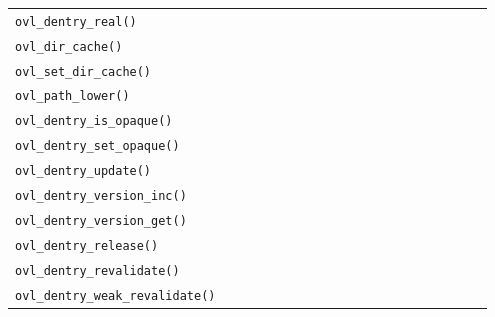 \documentclass[twoside,11pt,fleqn]{book}
\begin{document}
\begin{table}[!h]
\begin{tabular}{|p{0.30\linewidth}|p{0.65\linewidth}|}
\texttt{ovl\_dentry\_real()}&\\ \cline{1-1}
\texttt{ovl\_dir\_cache()}&\\ \cline{1-1}
\texttt{ovl\_set\_dir\_cache()}&\\ \cline{1-1}
\texttt{ovl\_path\_lower()}&\\ \cline{1-1}
\texttt{ovl\_dentry\_is\_opaque()}&\\ \cline{1-1}
\texttt{ovl\_dentry\_set\_opaque()}&\\ \cline{1-1}
\texttt{ovl\_dentry\_update()}&\\ \cline{1-1}
\texttt{ovl\_dentry\_version\_inc()}& \\ \cline{1-1}
\texttt{ovl\_dentry\_version\_get()}&\\ \cline{1-1}
\texttt{ovl\_dentry\_release()}&  \\ \cline{1-1}
\texttt{ovl\_dentry\_revalidate()}&  \\ \cline{1-1}
\texttt{ovl\_dentry\_weak\_revalidate()}&  \\ \cline{1-2}

\end{tabular}
\vspace{-0em}
\end{table}
\FloatBarrier
\end{document}
